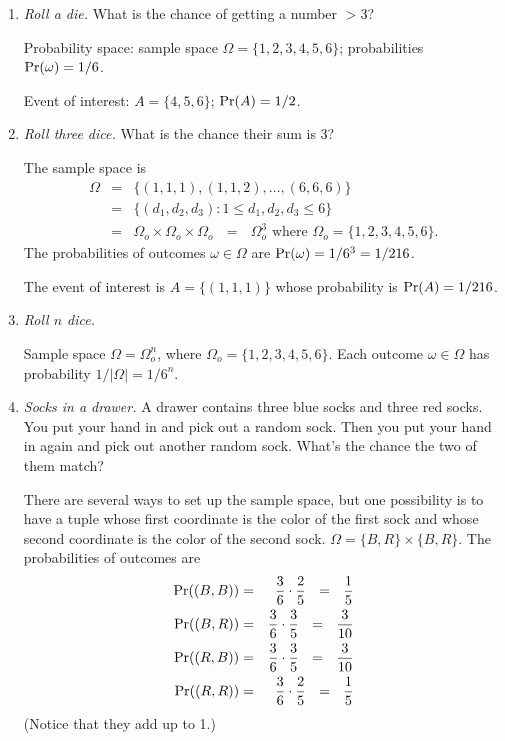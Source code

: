 \begin{enumerate}
\item {\it Roll a die.} What is the chance of getting a number $> 3$?

Probability space: sample space $\Omega = \{1,2,3,4,5,6\}$; probabilities $\mbox{\rm Pr}(\omega) = 1/6$.

Event of interest: $A = \{4,5,6\}$; $\mbox{\rm Pr}(A) = 1/2$.

\item {\it Roll three dice.} What is the chance their sum is 3?

The sample space is 
\begin{eqnarray*}
\Omega 
& = & \{(1,1,1), (1,1,2), \ldots, (6,6,6)\} \\
& = & \{(d_1, d_2, d_3): 1 \leq d_1, d_2, d_3 \leq 6\} \\
& = & \Omega_o \times \Omega_o \times \Omega_o 
\ \ \ = \ \ \ \Omega_o^3 \mbox{\ \ \ \ where\ } \Omega_o = \{1,2,3,4,5,6\}.
\end{eqnarray*}
The probabilities of outcomes $\omega \in \Omega$ are $\mbox{\rm Pr}(\omega) = 1/6^3 = 1/216$.

The event of interest is $A = \{(1,1,1)\}$ whose probability is $\mbox{\rm Pr}(A) = 1/216$.

\item {\it Roll $n$ dice.}

Sample space $\Omega = \Omega_o^n$, where $\Omega_o = \{1,2,3,4,5,6\}$. Each outcome $\omega \in \Omega$ has probability $1/|\Omega| = 1/6^n$.

\item {\it Socks in a drawer.} A drawer contains three blue socks and three red socks. You put your hand in and pick out a random sock. Then you put your hand in again and pick out another random sock. What's the chance the two of them match?

There are several ways to set up the sample space, but one possibility is to have a tuple whose first coordinate is the color of the first sock and whose second coordinate is the color of the second sock. $\Omega = \{B,R\} \times \{B,R\}$. The probabilities of outcomes are
\begin{eqnarray*}
\pr((B,B)) & = & \frac{3}{6} \cdot \frac{2}{5} \ \ = \ \ \frac{1}{5} \\
\pr((B,R)) & = & \frac{3}{6} \cdot \frac{3}{5} \ \ = \ \ \frac{3}{10} \\
\pr((R,B)) & = & \frac{3}{6} \cdot \frac{3}{5} \ \ = \ \ \frac{3}{10} \\
\pr((R,R)) & = & \frac{3}{6} \cdot \frac{2}{5} \ \ = \ \ \frac{1}{5}
\end{eqnarray*}
(Notice that they add up to 1.)


\end{enumerate}

